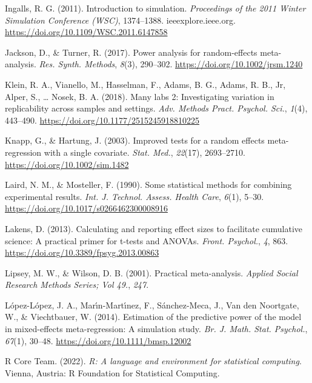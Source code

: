 \documentclass[
  man,floatsintext]{apa6}
\newlength{\cslhangindent}
\newenvironment{CSLReferences}[2] %
 {\begin{list}{}{%
  \setlength{\itemindent}{0pt}
  \setlength{\leftmargin}{0pt}
  \setlength{\parsep}{0pt}
  \ifodd #1
   \setlength{\leftmargin}{\cslhangindent}
   \setlength{\itemindent}{-1\cslhangindent}
  \fi
  \setlength{\itemsep}{#2\baselineskip}}}
 {\end{list}}
\begin{document}
\begin{CSLReferences}{1}{0}
Ingalls, R. G. (2011). Introduction to simulation. \emph{Proceedings of the 2011 Winter Simulation Conference ({WSC})}, 1374--1388. ieeexplore.ieee.org. \url{https://doi.org/10.1109/WSC.2011.6147858}

Jackson, D., \& Turner, R. (2017). Power analysis for random-effects meta-analysis. \emph{Res. Synth. Methods}, \emph{8}(3), 290--302. \url{https://doi.org/10.1002/jrsm.1240}

Klein, R. A., Vianello, M., Hasselman, F., Adams, B. G., Adams, R. B., Jr, Alper, S., \ldots{} Nosek, B. A. (2018). Many labs 2: Investigating variation in replicability across samples and settings. \emph{Adv. Methods Pract. Psychol. Sci.}, \emph{1}(4), 443--490. \url{https://doi.org/10.1177/2515245918810225}

Knapp, G., \& Hartung, J. (2003). Improved tests for a random effects meta-regression with a single covariate. \emph{Stat. Med.}, \emph{22}(17), 2693--2710. \url{https://doi.org/10.1002/sim.1482}

Laird, N. M., \& Mosteller, F. (1990). Some statistical methods for combining experimental results. \emph{Int. J. Technol. Assess. Health Care}, \emph{6}(1), 5--30. \url{https://doi.org/10.1017/s0266462300008916}

Lakens, D. (2013). Calculating and reporting effect sizes to facilitate cumulative science: A practical primer for t-tests and {ANOVAs}. \emph{Front. Psychol.}, \emph{4}, 863. \url{https://doi.org/10.3389/fpsyg.2013.00863}

Lipsey, M. W., \& Wilson, D. B. (2001). Practical meta-analysis. \emph{Applied Social Research Methods Series; Vol 49.}, \emph{247}.

López-López, J. A., Marı́n-Martı́nez, F., Sánchez-Meca, J., Van den Noortgate, W., \& Viechtbauer, W. (2014). Estimation of the predictive power of the model in mixed-effects meta-regression: A simulation study. \emph{Br. J. Math. Stat. Psychol.}, \emph{67}(1), 30--48. \url{https://doi.org/10.1111/bmsp.12002}

R Core Team. (2022). \emph{R: A language and environment for statistical computing}. Vienna, Austria: R Foundation for Statistical Computing.


\end{CSLReferences}
\end{document}
